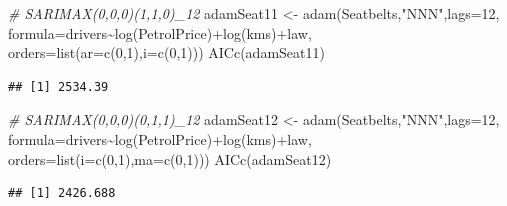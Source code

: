 \documentclass[
]{book}
\newenvironment{Shaded}{\begin{snugshade}}{\end{snugshade}}
\newcommand{\AttributeTok}[1]{\textcolor[rgb]{0.77,0.63,0.00}{#1}}
\newcommand{\CommentTok}[1]{\textcolor[rgb]{0.56,0.35,0.01}{\textit{#1}}}
\newcommand{\DecValTok}[1]{\textcolor[rgb]{0.00,0.00,0.81}{#1}}
\newcommand{\FunctionTok}[1]{\textcolor[rgb]{0.00,0.00,0.00}{#1}}
\newcommand{\NormalTok}[1]{#1}
\newcommand{\OtherTok}[1]{\textcolor[rgb]{0.56,0.35,0.01}{#1}}
\newcommand{\SpecialCharTok}[1]{\textcolor[rgb]{0.00,0.00,0.00}{#1}}
\newcommand{\StringTok}[1]{\textcolor[rgb]{0.31,0.60,0.02}{#1}}
\theoremstyle{definition}
\theoremstyle{definition}
\theoremstyle{definition}
\theoremstyle{definition}
\theoremstyle{remark}
\begin{document}
\begin{Shaded}
\begin{Highlighting}[]
\CommentTok{\# SARIMAX(0,0,0)(1,1,0)\_12}
\NormalTok{adamSeat11 }\OtherTok{\textless{}{-}} \FunctionTok{adam}\NormalTok{(Seatbelts,}\StringTok{"NNN"}\NormalTok{,}\AttributeTok{lags=}\DecValTok{12}\NormalTok{,}
                   \AttributeTok{formula=}\NormalTok{drivers}\SpecialCharTok{\textasciitilde{}}\FunctionTok{log}\NormalTok{(PetrolPrice)}\SpecialCharTok{+}\FunctionTok{log}\NormalTok{(kms)}\SpecialCharTok{+}\NormalTok{law,}
                   \AttributeTok{orders=}\FunctionTok{list}\NormalTok{(}\AttributeTok{ar=}\FunctionTok{c}\NormalTok{(}\DecValTok{0}\NormalTok{,}\DecValTok{1}\NormalTok{),}\AttributeTok{i=}\FunctionTok{c}\NormalTok{(}\DecValTok{0}\NormalTok{,}\DecValTok{1}\NormalTok{)))}
\FunctionTok{AICc}\NormalTok{(adamSeat11)}
\end{Highlighting}
\end{Shaded}

\begin{verbatim}
## [1] 2534.39
\end{verbatim}

\begin{Shaded}
\begin{Highlighting}[]
\CommentTok{\# SARIMAX(0,0,0)(0,1,1)\_12}
\NormalTok{adamSeat12 }\OtherTok{\textless{}{-}} \FunctionTok{adam}\NormalTok{(Seatbelts,}\StringTok{"NNN"}\NormalTok{,}\AttributeTok{lags=}\DecValTok{12}\NormalTok{,}
                   \AttributeTok{formula=}\NormalTok{drivers}\SpecialCharTok{\textasciitilde{}}\FunctionTok{log}\NormalTok{(PetrolPrice)}\SpecialCharTok{+}\FunctionTok{log}\NormalTok{(kms)}\SpecialCharTok{+}\NormalTok{law,}
                   \AttributeTok{orders=}\FunctionTok{list}\NormalTok{(}\AttributeTok{i=}\FunctionTok{c}\NormalTok{(}\DecValTok{0}\NormalTok{,}\DecValTok{1}\NormalTok{),}\AttributeTok{ma=}\FunctionTok{c}\NormalTok{(}\DecValTok{0}\NormalTok{,}\DecValTok{1}\NormalTok{)))}
\FunctionTok{AICc}\NormalTok{(adamSeat12)}
\end{Highlighting}
\end{Shaded}

\begin{verbatim}
## [1] 2426.688
\end{verbatim}
\end{document}
